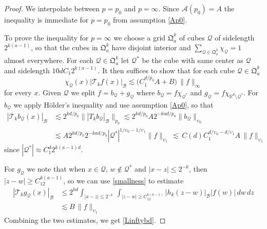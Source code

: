 \documentclass[11pt]{amsart}
\theoremstyle{definition}
\numberwithin{theorem}{section}
\numberwithin{definition}{section}
\renewcommand{\wp}{\upsilon}
\newcommand{\Be}{\begin{equation}}
\newcommand{\Ee}{\end{equation}}
\newcommand{\note}[1]{\footnote{\texttt{\Small #1}}}
\def\sB{{\mathscr{B}}}
\def\lc{\lesssim}
\def\fQ{{\mathfrak {Q}}}
\def\bbR{{\mathbb {R}}}
\def\cA{{\mathcal {A}}}
\def\cQ{{\mathcal {Q}}}
\def\cT{{\mathcal {T}}}
\begin{document}
\begin{proof}
We interpolate between $p=p_0$ and $p=\infty$.
Since $\cA(p_0)=A$ the inequality is immediate for $p=p_0$
from assumption \eqref{Ap0}.

To prove the inequality for $p=\infty$ we choose a grid $\fQ^k_a$ of
cubes $\mathcal{Q}$  of
sidelength $2^{k(a-1)}$,
so that the cubes in $\fQ^k_a$ have  disjoint interior
and  $\sum_{\mathcal{Q}\in \fQ^k_a}\chi_\mathcal{Q}=1$ almost everywhere. For  each $\cQ\in \fQ^k_a$  let
$\mathcal{Q}^*$ be the cube with
same center as $\mathcal{Q}$ and sidelength $10 d  C_1 2^{k(a-1)}$.
It then  suffices to show that for each
cube $\cQ\in \fQ^k_a$
\Be \label{Linftybd}
\chi_\cQ(x)| \cT_k f(x)|_\sB \lc \big(C_1^{d/p_0} A+B\big) \, \|f\|_\infty
\Ee
for every $x$.
Given $\mathcal{Q}$ we split $f= b_\cQ+g_\cQ$ where $b_\cQ=f\chi_{\cQ^*}$ and $g_\cQ= f\chi_{\bbR^d\setminus \cQ^*}$.
For $b_\cQ$ we apply H\"older's inequality and use assumption \eqref{Ap0}, so that
\begin{align*}
|\cT_k b_\cQ(x)|_\sB &\lc 2^{kd/p_0} \big\||T_k b_\cQ|_\sB\big\|_{p_0} \lc
2^{kd/p_0} A 2^{-kad/p_0}
\|b_\cQ\|_{\wp_0}
\\&\lc  A  2^{kd/p_0} 2^{-kad/p_0} |\cQ^*|^{1/\wp_0-1/\wp_1} \|f\|_{\wp_1}
\,\lc\,C(d)  C_1^{d/\wp_0-d/\wp_1}A\,\|f\|_{\wp_1}
\end{align*}
since $|\cQ^*| \approx C_1^d 2^{k(a-1)d}$.

For $g_\cQ$ we note that when $x\in \cQ$, $w\notin \cQ^*$ and $|x-z|\le 2^{-k}$, then $|z-w|\ge C_12^{k(a-1)}$, so we can  use \eqref{smallness} to estimate
\begin{align*}
|\cT_k g_\cQ(x)|_\sB &\le 2^{kd}\int_{|x-z|\le 2^{-k}}\,
\int_{|z-w|\ge C_12^{k(a-1)}} |h_k(z-w)|_{\sB}|f(w)|\, dw \, dz
\\&\lc B\,\|f\|_{\wp_1}
\end{align*}
Combining the two estimates, we  get \eqref{Linftybd}.
\end{proof}
\end{document}
